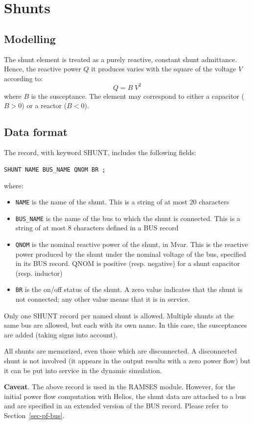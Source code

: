 \vspace*{-2ex}
\section{Shunts}\label{sec-netw-shunts}

\subsection{Modelling}

The shunt element is treated as a purely reactive, constant shunt admittance. Hence, the reactive power $Q$ it produces varies with the square of the voltage $V$ according to:
\[ Q = B \; V^2 \]
where $B$ is the susceptance. The element may correspond to either a capacitor ($B>0$) or a reactor ($B<0$).

\subsection{Data format}

The record, with keyword SHUNT, includes the following fields:

\hspace*{5ex}\mbox{\tt SHUNT NAME BUS\_NAME QNOM BR ;}

where:
\begin{itemize}
\item{\tt NAME} is the name of the shunt. This is a string of at most 20 characters
\item{\tt BUS\_NAME} is the name of the bus to which the shunt is connected. This is a string of at most 8 characters defined in a BUS record
\item{\tt QNOM} is the nominal reactive power of the shunt, in Mvar. This is the reactive power produced by the shunt under the nominal voltage of the bus, specified in its BUS record. QNOM is positive (resp. negative) for a shunt capacitor (resp. inductor)
\item{\tt BR} is the on/off status of the shunt. A zero value indicates that the shunt
is not connected; any other value means that it is in service.
\end{itemize}

Only one SHUNT record per named shunt is allowed. Multiple shunts at the same bus are allowed, but each with its own name. In this case, the susceptances are added (taking signs into account).

All shunts are memorized, even those which are disconnected. A disconnected shunt is not involved (it appears in the output results with a zero power flow) but it can be put into service in the dynamic simulation.

{\bf \large Caveat}. The above record is used in the RAMSES module. However, for the initial power flow computation with Helios, the shunt data are attached to a bus and are specified in an extended version of the BUS record. Please refer to Section~\ref{sec-pf-bus}.


